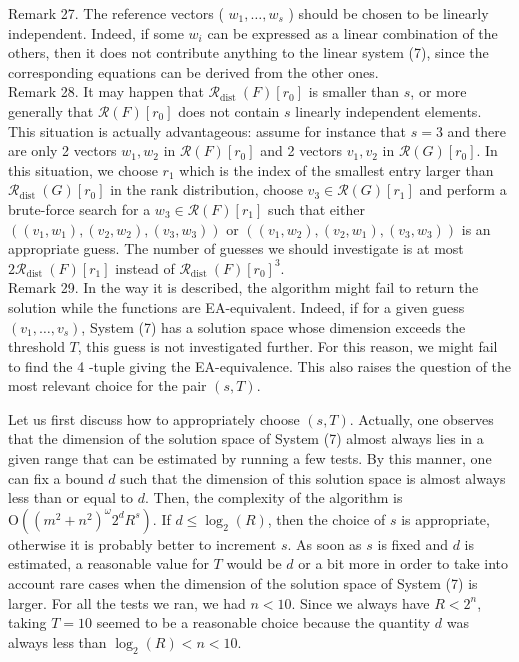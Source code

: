 \documentclass[10pt]{article}
\begin{document}
Remark 27. The reference vectors ( $w_{1}, \ldots, w_{s}$ ) should be chosen to be linearly independent. Indeed, if some $w_{i}$ can be expressed as a linear combination of the others, then it does not contribute anything to the linear system (7), since the corresponding equations can be derived from the other ones.\\
Remark 28. It may happen that $\mathcal{R}_{\text {dist }}(F)\left[r_{0}\right]$ is smaller than $s$, or more generally that $\mathcal{R}(F)\left[r_{0}\right]$ does not contain $s$ linearly independent elements. This situation is actually advantageous: assume for instance that $s=3$ and there are only 2 vectors $w_{1}, w_{2}$ in $\mathcal{R}(F)\left[r_{0}\right]$ and 2 vectors $v_{1}, v_{2}$ in $\mathcal{R}(G)\left[r_{0}\right]$. In this situation, we choose $r_{1}$ which is the index of the smallest entry larger than $\mathcal{R}_{\text {dist }}(G)\left[r_{0}\right]$ in the rank distribution, choose $v_{3} \in \mathcal{R}(G)\left[r_{1}\right]$ and perform a brute-force search for a $w_{3} \in \mathcal{R}(F)\left[r_{1}\right]$ such that either $\left(\left(v_{1}, w_{1}\right),\left(v_{2}, w_{2}\right),\left(v_{3}, w_{3}\right)\right)$ or $\left(\left(v_{1}, w_{2}\right),\left(v_{2}, w_{1}\right),\left(v_{3}, w_{3}\right)\right)$ is an appropriate guess. The number of guesses we should investigate is at most $2 \mathcal{R}_{\text {dist }}(F)\left[r_{1}\right]$ instead of $\mathcal{R}_{\text {dist }}(F)\left[r_{0}\right]^{3}$.\\
Remark 29. In the way it is described, the algorithm might fail to return the solution while the functions are EA-equivalent. Indeed, if for a given guess $\left(v_{1}, \ldots, v_{s}\right)$, System (7) has a solution space whose dimension exceeds the threshold $T$, this guess is not investigated further. For this reason, we might fail to find the 4 -tuple giving the EA-equivalence. This also raises the question of the most relevant choice for the pair $(s, T)$.

Let us first discuss how to appropriately choose $(s, T)$. Actually, one observes that the dimension of the solution space of System (7) almost always lies in a given range that can be estimated by running a few tests. By this manner, one can fix a bound $d$ such that the dimension of this solution space is almost always less than or equal to $d$. Then, the complexity of the algorithm is $\mathrm{O}\left(\left(m^{2}+n^{2}\right)^{\omega} 2^{d} R^{s}\right)$. If $d \leqslant \log _{2}(R)$, then the choice of $s$ is appropriate, otherwise it is probably better to increment $s$. As soon as $s$ is fixed and $d$ is estimated, a reasonable value for $T$ would be $d$ or a bit more in order to take into account rare cases when the dimension of the solution space of System (7) is larger. For all the tests we ran, we had $n<10$. Since we always have $R<2^{n}$, taking $T=10$ seemed to be a reasonable choice because the quantity $d$ was always less than $\log _{2}(R)<n<10$.
\end{document}
